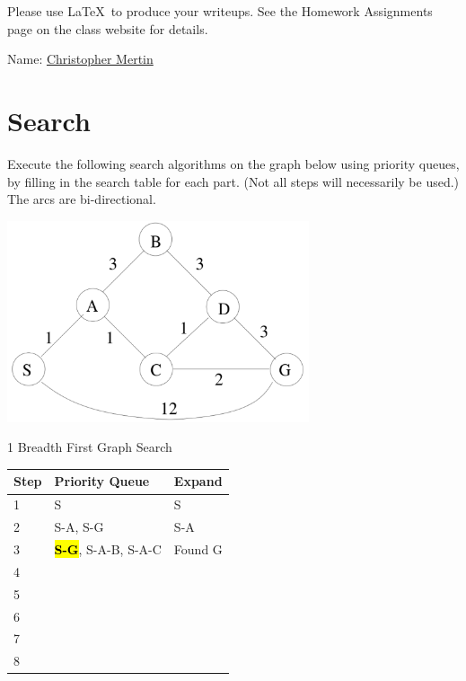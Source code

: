 \documentclass[11pt]{article}
\begin{document}
\thispagestyle{empty}

\renewcommand{\arraystretch}{1.5}




Please use \LaTeX\ to produce your writeups. See the Homework Assignments 
page on the class website for details.

\begin{flushleft}
Name: \underline{Christopher Mertin}
\end{flushleft}

\section{Search}

Execute the following search algorithms on the graph below using
priority queues, by filling in the search table for each part.  (Not
all steps will necessarily be used.)  The arcs are bi-directional.

  \begin{center}
  \centerline{\includegraphics[width=3.5in]{diagram.pdf}}
  \end{center}

  \begin{description}

  \item[1 Breadth First Graph Search]

  \end{description}

    \begin{center}
    \begin{tabular}{|l|l|l|} \hline
    \bf Step & \bf Priority Queue  & \bf Expand \\ \hline
    1 & S & S \\ \hline
    2 & S-A, S-G & S-A\\ \hline
    3 & \textcolor{red}{\textbf{\hl{S-G}}}, S-A-B, S-A-C&  Found G\\ \hline
    4 & & \\ \hline
    5 & &  \\ \hline
    6 &  &  \\ \hline
    7 &   &  \\ \hline
    8 &   &  \\ \hline
    \end{tabular}
    \end{center}
\end{document}
